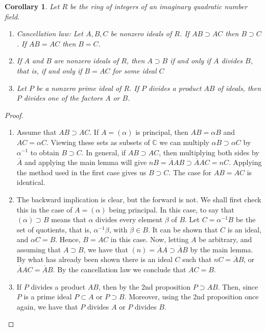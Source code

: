 \documentclass[12pt]{article}
\newtheorem{cor}[thm]{Corollary}
\theoremstyle{definition}
\theoremstyle{remark}
\numberwithin{equation}{section}
\newcommand\C{\mathbb C}    %
\begin{document}
\begin{cor}
        Let $R$ be the ring of integers of an imaginary quadratic number field.\begin{enumerate}
                \item Cancellation law: Let $A,B,C$ be nonzero ideals of $R$. If $AB \supset AC$ then $B \supset C$. If $AB = AC$ then $B = C$.
                \item If $A$ and $B$ are nonzero ideals of $R$, then $A \supset B$ if and only if $A$ divides $B$, that is, if and only if $B = AC$ for some ideal $C$
                \item Let $P$ be a nonzero prime ideal of $R$. If $P$ divides a product $AB$ of ideals, then $P$ divides one of the factors $A$ or $B$.
        \end{enumerate}
\end{cor}
\begin{proof}
        \begin{enumerate}
                \item Assume that $AB\supset AC$. If $A = (\alpha)$ is principal, then $AB = \alpha B$ and $AC = \alpha C$. Viewing these sets as subsets of $\C$ we can multiply $\alpha B \supset \alpha C$ by $\alpha^{-1}$ to obtain $B \supset C$. In general, if $AB \supset AC$, then multiplying both sides by $\overline{A}$ and applying the main lemma will give $nB = \overline{A}AB \supset \overline{A}AC = nC$. Applying the method used in the first case gives us $B \supset C$. The case for $AB =AC$ is identical.
                \item The backward implication is clear, but the forward is not. We shall first check this in the case of $A = (\alpha)$ being principal. In this case, to say that $(\alpha) \supset B$ means that $\alpha$ divides every element $\beta$ of $B$. Let $C = \alpha^{-1}B$ be the set of quotients, that is, $\alpha^{-1}\beta$, with $\beta \in B$. It can be shown that $C$ is an ideal, and $\alpha C = B$. Hence, $B = AC$ in this case. Now, letting $A$ be arbitrary, and assuming that $A \supset B$, we have that $(n) = \overline{A}A \supset \overline{A}B$ by the main lemma. By what has already been shown there is an ideal $C$ such that $nC = \overline{A}B$, or $\overline{A}AC = \overline{A}B$. By the cancellation law we conclude that $AC = B$.
                \item If $P$ divides a product $AB$, then by the 2nd proposition $P \supset AB$. Then, since $P$ is a prime ideal $P \subset A$ or $P \supset B$. Moreover, using the 2nd proposition once again, we have that $P$ divides $A$ or $P$ divides $B$.
        \end{enumerate}
\end{proof}
\end{document}
